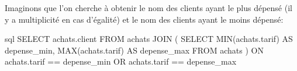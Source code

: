 \documentclass[a4paper]{scrartcl}
\begin{document}
			\exemple Imaginons que l'on cherche à obtenir le nom des clients ayant le plus dépensé (il y a multiplicité en cas d'égalité)
			et le nom des clients ayant le moins dépensé:

			\begin{code}{sql}
				SELECT achats.client
				FROM achats
				JOIN
				(
					SELECT MIN(achats.tarif) AS depense_min, MAX(achats.tarif) AS depense_max
					FROM achats
				)
				ON achats.tarif == depense_min OR achats.tarif == depense_max
			\end{code}
		
\end{document}
